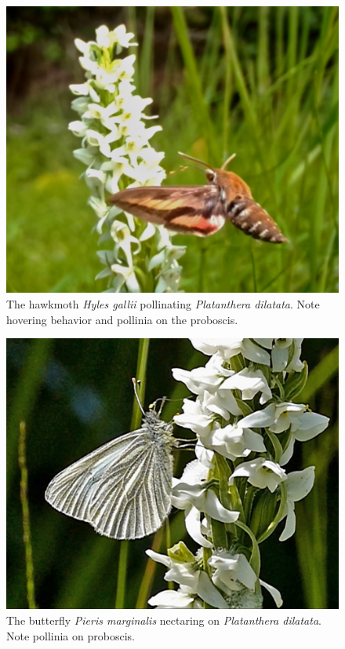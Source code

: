 \begin{multicols}{2}
\begin{figure}[H]
\begin{center}
\vspace{2mm}
\includegraphics[width=\textwidth]{img/Platanthera_dilatata_Hyles_galii.jpg}
\caption{The hawkmoth \emph{Hyles gallii} pollinating \emph{Platanthera dilatata}. Note hovering behavior and pollinia on the proboscis.}
\label{Platanthera_dilatata_Hyles_galii}
\end{center}
\end{figure}

\begin{figure}[H]
\begin{center}
\vspace{2mm}
\includegraphics[width=\textwidth]{img/Platanthera_dilatata_Pieris_marginalis.jpg}
\caption{The butterfly \emph{Pieris marginalis} nectaring on \emph{Platanthera dilatata}.  Note pollinia on proboscis.}
\label{Platanthera_dilatata_Pieris_marginalis}
\end{center}
\end{figure}


\end{multicols}
